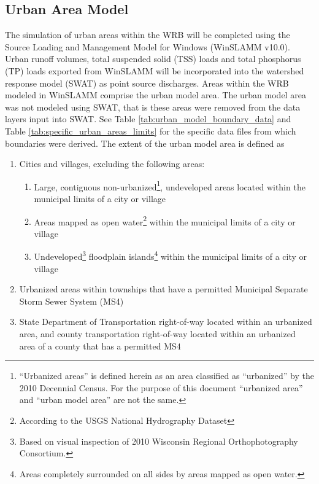 
\subsection{Urban Area Model}\label{sec:urban}
The simulation of urban areas within the WRB will be completed using the Source Loading and Management Model for Windows (WinSLAMM v10.0). Urban runoff volumes, total suspended solid (TSS) loads and total phosphorus (TP) loads exported from WinSLAMM will be incorporated into the watershed response model (SWAT) as point source discharges. Areas within the WRB modeled in WinSLAMM comprise the urban model area. The urban model area was not modeled using SWAT, that is these areas were removed from the data layers input into SWAT. See Table \ref{tab:urban_model_boundary_data} and Table \ref{tab:specific_urban_areas_limits} for the specific data files from which boundaries were derived. The extent of the urban model area is defined as 

\begin{enumerate}
	\item Cities and villages, excluding the following areas:
	\begin{enumerate}
		\item Large, contiguous non-urbanized\footnote{``Urbanized areas'' is defined herein as an area classified as ``urbanized'' by the 2010 Decennial Census. For the purpose of this document ``urbanized area'' and ``urban model area'' are not the same.}, undeveloped areas located within the municipal limits of a city or village
		\item Areas mapped as open water\footnote{According to the USGS National Hydrography Dataset} within the municipal limits of a city or village
		\item Undeveloped\footnote{Based on visual inspection of 2010 Wisconsin Regional Orthophotography Consortium.} floodplain islands\footnote{Areas completely surrounded on all sides by areas mapped as open water.} within the municipal limits of a city or village
	\end{enumerate}

	\item Urbanized areas within townships that have a permitted Municipal Separate Storm Sewer System (MS4)
	\item State Department of Transportation right-of-way located within an urbanized area, and county transportation right-of-way located within an 	urbanized area of a county that has a permitted MS4
\end{enumerate}

